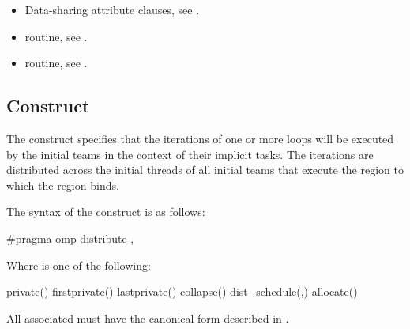 \crossreferences
\begin{itemize}

\item Data-sharing attribute clauses, see
.

\item {} routine, see
.

\item {} routine, see
.
\end{itemize}









\subsection{ Construct}
\label{subsec:distribute Construct}
\summary
The  construct specifies that the iterations of one or more loops will be
executed by the initial teams in the context of their implicit tasks. The iterations are
distributed across the initial threads of all initial teams that execute the  region to
which the  region binds.

\syntax
\begin{ccppspecific}
The syntax of the  construct is as follows:

\begin{ompcPragma}
#pragma omp distribute \plc{[clause[ [},\plc{] clause] ... ] new-line}
\end{ompcPragma}

Where  is one of the following:

\begin{indentedcodelist}
private()
firstprivate()
lastprivate()
collapse()
dist_schedule(\plc{kind[},\plc{ chunk_size]})
allocate(\plc{[allocator: ]})
\end{indentedcodelist}

All associated  must have the canonical form described in
.
\end{ccppspecific}
\bigskip

